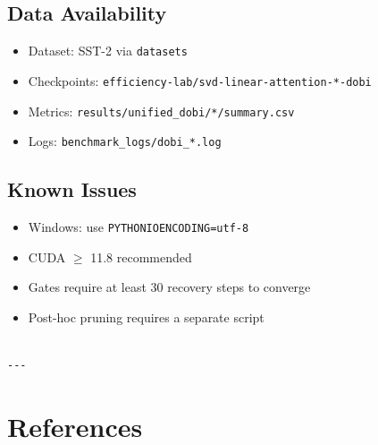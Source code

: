 \subsection{Data Availability}

\begin{itemize}
\item Dataset: SST-2 via \texttt{datasets}
\item Checkpoints: \texttt{efficiency-lab/svd-linear-attention-*-dobi}
\item Metrics: \texttt{results/unified\_dobi/*/summary.csv}
\item Logs: \texttt{benchmark\_logs/dobi\_*.log}

\end{itemize}
\subsection{Known Issues}

\begin{itemize}
\item Windows: use \texttt{PYTHONIOENCODING=utf-8}
\item CUDA $\ge$ 11.8 recommended
\item Gates require at least 30 recovery steps to converge
\item Post-hoc pruning requires a separate script
\end{itemize}
\begin{lstlisting}

---
\end{lstlisting}


\section{References}

